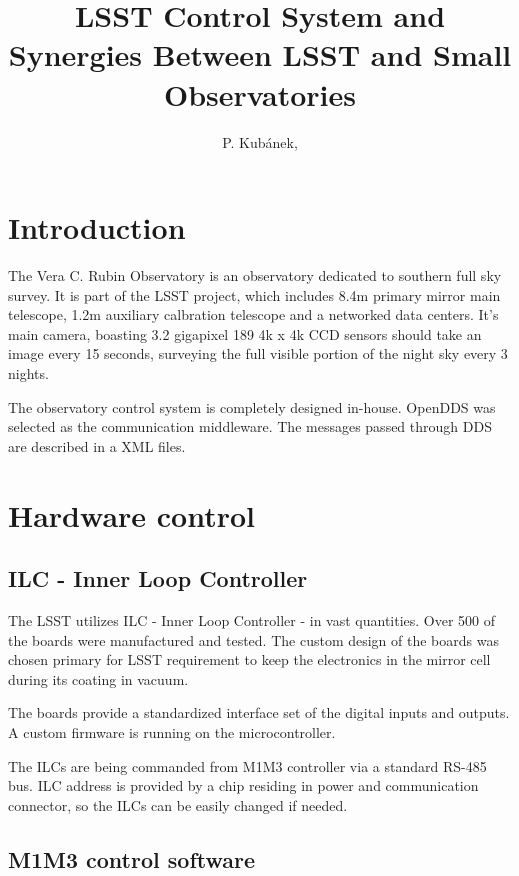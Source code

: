\documentclass[proceedings, preprint]{rmaa}
\title{LSST Control System and Synergies Between LSST and Small Observatories}
\author{
  P. Kub\'anek,\altaffilmark{1} 
}
\begin{document}
\maketitle


\section{Introduction}
\label{sec:intro}

The Vera C. Rubin Observatory is an observatory dedicated to southern full sky
survey. It is part of the LSST\cite{2019lsst} project, which includes 8.4m
primary mirror main telescope, 1.2m auxiliary calbration telescope and a
networked data centers. It's main camera, boasting 3.2 gigapixel 189 4k x 4k
CCD sensors should take an image every 15 seconds, surveying the full visible
portion of the night sky every 3 nights.

The observatory control system is completely designed in-house.
OpenDDS\cite{opendds} was selected as the communication middleware. The
messages passed through DDS are described in a XML files\cite{salxml}.

\section{Hardware control}

\subsection{ILC - Inner Loop Controller}

The LSST utilizes ILC\cite{2014ilc} - Inner Loop Controller - in vast
quantities. Over 500 of the boards were manufactured and tested. The custom
design of the boards was chosen primary for LSST requirement to keep the
electronics in the mirror cell during its coating in vacuum.

The boards provide a standardized interface set of the digital inputs and
outputs. A custom firmware is running on the microcontroller.

The ILCs are being commanded from M1M3 controller via a standard RS-485 bus.
ILC address is provided by a chip residing in power and communication
connector, so the ILCs can be easily changed if needed.

\subsection{M1M3 control software}
\end{document}
